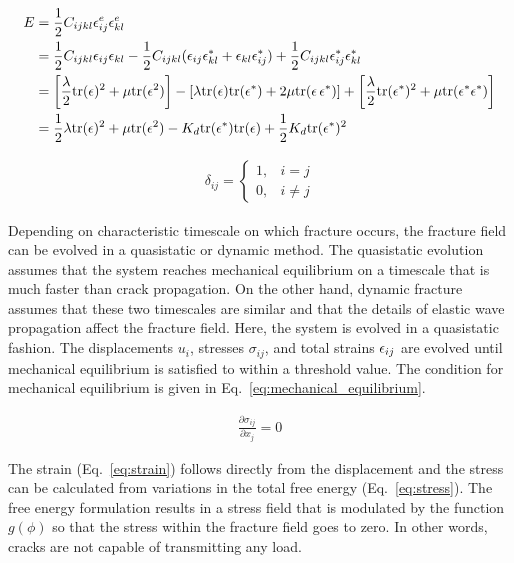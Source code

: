 \begin{align}
    E &= \frac{1}{2} C_{ijkl} \epsilon^e_{ij}\epsilon^e_{kl}	 \label{eq:elastic_strain_energy_density}\\
	&= \frac{1}{2} C_{ijkl}\epsilon_{ij}\epsilon_{kl} - \frac{1}{2} C_{ijkl}(\epsilon_{ij}\epsilon^*_{kl} + \epsilon_{kl}\epsilon^*_{ij}) + \frac{1}{2} C_{ijkl}\epsilon^*_{ij}\epsilon^*_{kl} \notag\\
	&=\left[\frac{\lambda}{2} \text{tr}(\epsilon)^2 + \mu \text{tr}(\epsilon^2)\right]- \left[ \lambda \text{tr}(\epsilon)\text{tr}(\epsilon^*) + 2\mu\text{tr}(\epsilon\,\epsilon^*) \right] + \left[\frac{\lambda}{2} \text{tr}(\epsilon^*)^2 + \mu \text{tr}(\epsilon^*\epsilon^*)\right]\label{eq:isotropic_strain_energy_density}\\
	&= 	\frac{1}{2} \lambda \text{tr}(\epsilon)^2 + \mu\text{tr}(\epsilon^2) - K_d \text{tr}(\epsilon^*)\text{tr}(\epsilon) + \frac{1}{2}K_d \text{tr}(\epsilon^*)^2\label{eq:hydrostatic_strain_energy_density}
\end{align}

\begin{align} \label{eq:kronecker_delta}
	\delta_{ij} =
	\begin{cases}
		1, & i=j\\
		0, & i\ne j
	\end{cases}
\end{align}

Depending on characteristic timescale on which fracture occurs, the fracture field can be evolved in a quasistatic or dynamic method. The quasistatic evolution assumes that the system reaches mechanical equilibrium on a timescale that is much faster than crack propagation. On the other hand, dynamic fracture assumes that these two timescales are similar and that the details of elastic wave propagation affect the fracture field. Here, the system is evolved in a quasistatic fashion. The displacements $u_i$, stresses $\sigma_{ij}$, and total strains $\epsilon_{ij}$ are evolved until mechanical equilibrium is satisfied to within a threshold value. The condition for mechanical equilibrium is given in Eq.~\ref{eq:mechanical_equilibrium}.

\begin{align} \label{eq:mechanical_equilibrium}
	\frac{\partial \sigma_{ij}}{\partial x_j} = 0
\end{align}

The strain (Eq.~\ref{eq:strain}) follows directly from the displacement and the stress can be calculated from variations in the total free energy (Eq.~\ref{eq:stress}). The free energy formulation results in a stress field that is modulated by the function $g(\phi)$ so that the stress within the fracture field goes to zero. In other words, cracks are not capable of transmitting any load.

